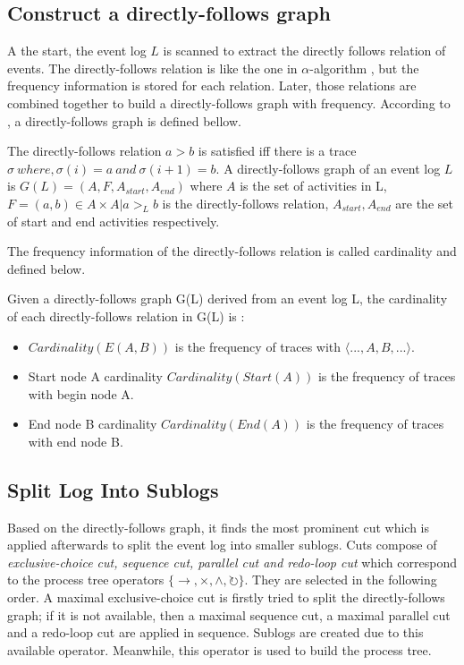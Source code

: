 \subsection{Construct a directly-follows graph}
A the start, the event log $L$ is scanned to extract the directly follows relation of events. The directly-follows relation is like the one in $\alpha$-algorithm \cite{van2004workflow, leemans2013discovering}, but the frequency information is stored for each relation. Later, those relations are combined together to build a directly-follows graph with frequency. According to \cite{van2016data, leemans2013discovering}, a directly-follows graph is defined bellow.
\begin{definition}
 The directly-follows relation $a > b$ is satisfied iff there is a trace $\sigma\ where, \sigma(i)=a \ and \ \sigma(i+1)=b$.
 A directly-follows graph of an event log $L$ is $G(L) = (A, F, A_{start}, A_{end}) $ where $A$ is the set of activities in L, $F={(a,b) \in A \times A | a >_L b} $ is the directly-follows relation, $A_{start}, A_{end}$ are the set of start and end activities respectively.
\end{definition}
The frequency information of the directly-follows relation is called cardinality and defined below.
\begin{definition}
Given a directly-follows graph G(L) derived from an event log L, the cardinality of each directly-follows relation in G(L) is :  
	\begin{itemize}
		\item $Cardinality(E(A,B))$ is the frequency of traces with $\langle ...,A,B,... \rangle$. 
		\item Start node A cardinality $Cardinality(Start(A))$ is the frequency of traces with begin node A.
		\item End node B cardinality $Cardinality(End(A))$ is the frequency of traces with end node B.
	\end{itemize}	
\end{definition}
\subsection{Split Log Into Sublogs}
Based on the directly-follows graph, it finds the most prominent cut which is applied afterwards to split the event log into smaller sublogs. Cuts compose of \emph{exclusive-choice cut, sequence cut, parallel cut and redo-loop cut} which correspond to the process tree operators $ \{\rightarrow, \times, \land, \circlearrowright \}$. They are selected in the following order. A maximal exclusive-choice cut is firstly tried to split the directly-follows graph; if it is not available, then a maximal sequence cut, a  maximal parallel cut and a redo-loop cut are applied in sequence. Sublogs are created due to this available operator. Meanwhile, this operator is used to build the process tree. 


